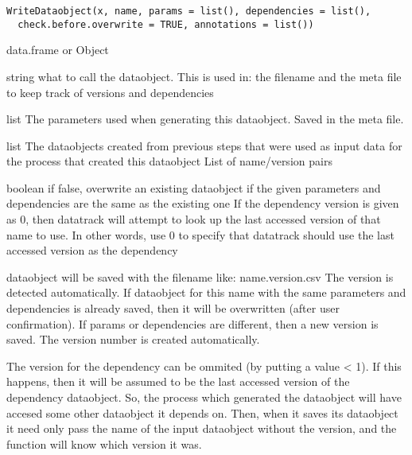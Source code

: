 \documentclass[a4paper]{book}
\begin{document}
%
\begin{Usage}
\begin{verbatim}
WriteDataobject(x, name, params = list(), dependencies = list(),
  check.before.overwrite = TRUE, annotations = list())
\end{verbatim}
\end{Usage}
%
\begin{Arguments}
\begin{ldescription}
\item[\code{x}] data.frame or Object

\item[\code{name}] string what to call the dataobject. This is used in: the filename and the meta file to keep track of versions and dependencies

\item[\code{params}] list The parameters used when generating this dataobject. Saved in the meta file.

\item[\code{dependencies}] list The dataobjects created from previous steps that were used as input data for the process that created this dataobject List of name/version pairs

\item[\code{check.before.overwrite}] boolean if false, overwrite an existing dataobject if the given parameters and dependencies are the same as the existing one
If the dependency version is given as 0, then datatrack will attempt to look up the last accessed version of that name to use. In other words, use 0 to
specify that datatrack should use the last accessed version as the dependency
\end{ldescription}
\end{Arguments}
%
\begin{Details}\relax
dataobject will be saved with the filename like: name.version.csv  The version is detected automatically.
If dataobject for this name with the same parameters and dependencies is already saved, then it will be overwritten (after user confirmation).
If params or dependencies are different, then a new version is saved. The version number is created automatically.

The version for the dependency can be ommited (by putting a value < 1). If this happens, then it will be assumed to be the last accessed version
of the dependency dataobject. So, the process which generated the dataobject will have accesed some other dataobject it depends on. Then, when it saves its dataobject
it need only pass the name of the input dataobject without the version, and the function will know which version it was.
\end{Details}
\end{document}
